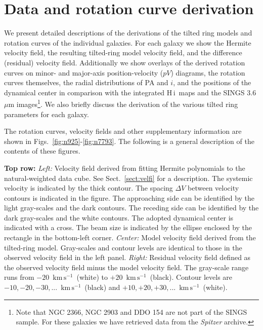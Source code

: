 \documentclass[usenatbib,usegraphicx,apjfonts,floatfix]{emulateapj}
\newcommand{\kms}{\ensuremath{\,\mbox{km}\,\mbox{s}^{-1}}}
\newcommand{\HI}{H\,{\sc i}}
\begin{document}

\clearpage

\appendix

\section{Data and rotation curve derivation}


We present detailed descriptions of the derivations of the tilted ring
models and rotation curves of the individual galaxies.  For each
galaxy we show the Hermite velocity field, the resulting tilted-ring
model velocity field, and the difference (residual) velocity
field. Additionally we show overlays of the derived rotation curves on
minor- and major-axis position-velocity ($pV$) diagrams, the rotation
curves themselves, the radial distributions of PA and $i$, and the
positions of the dynamical center in comparison with the integrated
\HI\ maps and the SINGS 3.6 $\mu$m images\footnote{Note that NGC 2366,
  NGC 2903 and DDO 154 are not part of the SINGS sample. For these
  galaxies we have retrieved data from the \emph{Spitzer}
  archive.}. We also briefly discuss the derivation of the various
tilted ring parameters for each galaxy.

The rotation curves, velocity fields and other supplementary
information are shown in Figs.~\ref{fig:n925}-\ref{fig:n7793}.
The following is a general description of the contents of these figures.

{\bf Top row:} \emph{Left:} Velocity field derived from fitting Hermite polynomials
to the natural-weighted data cube. See Sect.\
\ref{sect:velfi} for a description.  The systemic velocity is
indicated by the thick contour. The spacing $\Delta V$ between
velocity contours is indicated in the figure. The approaching side can
be identified by the light gray-scales and the dark contours. The
receding side can be identified by the dark gray-scales and the white
contours.  The adopted dynamical center is indicated with a cross. The
beam size is indicated by the ellipse enclosed by the rectangle in the
bottom-left corner. \emph{Center:} Model velocity field derived from
the tilted-ring model. Gray-scales and contour levels are
identical to those in the observed velocity field in the left
panel. \emph{Right:} Residual velocity field defined as the observed
velocity field minus the model velocity field. The gray-scale range
runs from $-20$ \kms\ (white) to $+20$ \kms\ (black). Contour levels
are $-10, -20, -30, ...$ \kms\ (black) and $+10, +20, +30, ...$ \kms\
(white).
\end{document}
